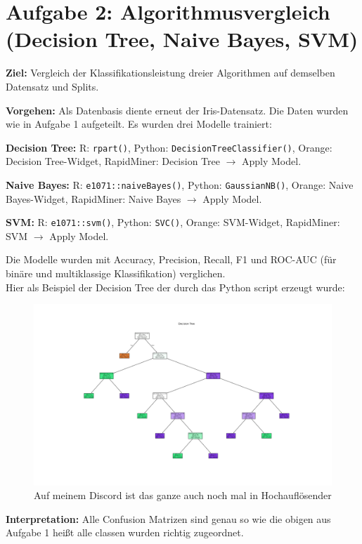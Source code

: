 \documentclass[a4paper,12pt]{scrartcl}
\begin{document}
\section*{Aufgabe 2: Algorithmusvergleich (Decision Tree, Naive Bayes, SVM)}

\textbf{Ziel:} Vergleich der Klassifikationsleistung dreier Algorithmen auf demselben Datensatz und Splits.\

\textbf{Vorgehen:} Als Datenbasis diente erneut der Iris-Datensatz. Die Daten wurden wie in Aufgabe 1 aufgeteilt. Es wurden drei Modelle trainiert:

\textbf{Decision Tree:} R: \lstinline|rpart()|, Python: \lstinline|DecisionTreeClassifier()|, Orange: Decision Tree-Widget, RapidMiner: Decision Tree $\to$ Apply Model.

\textbf{Naive Bayes:} R: \lstinline|e1071::naiveBayes()|, Python: \lstinline|GaussianNB()|, Orange: Naive Bayes-Widget, RapidMiner: Naive Bayes $\to$ Apply Model.

\textbf{SVM:} R: \lstinline|e1071::svm()|, Python: \lstinline|SVC()|, Orange: SVM-Widget, RapidMiner: SVM $\to$ Apply Model.

Die Modelle wurden mit Accuracy, Precision, Recall, F1 und ROC-AUC (für binäre und multiklassige Klassifikation) verglichen.\\
Hier als Beispiel der Decision Tree der durch das Python script erzeugt wurde:\\
\begin{figure}[htbp]
  \centering
  \includegraphics[scale=0.29]{Decision_tree.png}
  \caption{Auf meinem Discord ist das ganze auch noch mal in Hochauflösender}
\end{figure}



\textbf{Interpretation:} Alle Confusion Matrizen sind genau so wie die obigen aus Aufgabe 1 heißt alle classen wurden richtig zugeordnet.
\newpage
\end{document}
